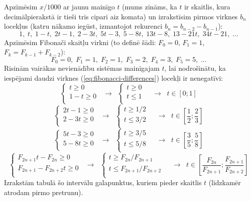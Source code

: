 \documentclass[a4paper,12pt]{article}
\begin{document}
\begin{problem}
{Apzīmēsim $x/1000$ ar jaunu mainīgo $t$ (mums zināms, ka $t$ ir skaitlis, kura decimālpierakstā ir tieši trīs cipari aiz komata)
un izrakstīsim pirmos virknes $b_n$ locekļus (katru nākamo iegūst, izmantojot rekurenci $b_n=b_{n-2}- b_{n-1}$):
\begin{equation}
\label{eq:fibonacci-differences}
1,\; t,\; 1-t,\; 2t-1,\; 2-3t,\; 5t-3,\; 5-8t,\; 13t-8,\; 13-21t,\; 34t-21,\;  \ldots
\end{equation}
Apzīmēsim Fibonači skaitļu virkni (to definē šādi: $F_0 = 0$, $F_1 = 1$, $F_k=F_{k-1}+F_{k-2}$): 
\[ F_0=0,\; F_1=1,\; F_2=1,\; F_3=2,\; F_4=3,\; F_5=5,\; \ldots \]
Risinām vairākas nevienādību sistēmas mainīgajam $t$, lai nodrošinātu, ka iespējami daudzi virknes (\ref{eq:fibonacci-differences}) 
locekļi ir nenegatīvi:
\[ 
\left\{ \begin{array}{l}
t \geq 0 \\
1 - t \geq 0 \\
\end{array} \right.
\;\;\rightarrow\;\;
\left\{ \begin{array}{l}
t \geq 0 \\
t \leq 1 \\
\end{array} \right.\;\;
\;\;\rightarrow\;\;
t \in [0;1] \]
\[ 
\left\{ \begin{array}{l}
2t-1 \geq 0 \\
2-3t \geq 0 \\
\end{array} \right.
\;\;\rightarrow\;\;
\left\{ \begin{array}{l}
t \geq 1/2 \\
t \leq 3/2 \\
\end{array} \right.\;\;
\;\;\rightarrow\;\;
t \in \left[ \frac{1}{2};\frac{2}{3} \right] \]
\[ \left\{ \begin{array}{l}
5t-3 \geq 0 \\
5-8t \geq 0 \\
\end{array} \right.
\;\;\rightarrow\;\;
\left\{ \begin{array}{l}
t \geq 3/5 \\
t \leq 5/8 \\
\end{array} \right.\;\;
\;\;\rightarrow\;\;
t \in \left[ \frac{3}{5};\frac{5}{8} \right] \]
\[ \left\{ \begin{array}{l}
F_{2n+1}t-F_{2n} \geq 0 \\
F_{2n+1}-F_{2n+2}t \geq 0 \\
\end{array} \right.
\;\;\rightarrow\;\;
\left\{ \begin{array}{l}
t \geq F_{2n}/F_{2n+1} \\
t \leq F_{2n+1}/F_{2n+2} \\
\end{array} \right.\;\;
\;\;\rightarrow\;\;
t \in \left[ \frac{F_{2n}}{F_{2n+1}};\frac{F_{2n+1}}{F_{2n+2}} \right] \]
Izrakstām tabulā šo intervālu galapunktus, kuriem pieder skaitlis $t$ (līdzkamēr atrodam pirmo pretrunu). 

}
\end{problem}
\end{document}
